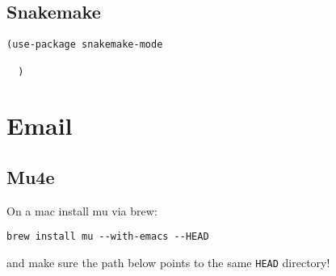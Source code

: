 \documentclass[12pt]{article}
\begin{document}
\subsection{Snakemake}
\label{sec:orgd2d1644}
\begin{verbatim}
(use-package snakemake-mode

  )
\end{verbatim}

\section{Email}
\label{sec:orgd37fdba}


\subsection{Mu4e}
\label{sec:org7f43a30}

On a mac install mu via brew:

\begin{verbatim}
brew install mu --with-emacs --HEAD
\end{verbatim}

and make sure the path below points to the same \texttt{HEAD} directory!
\end{document}
